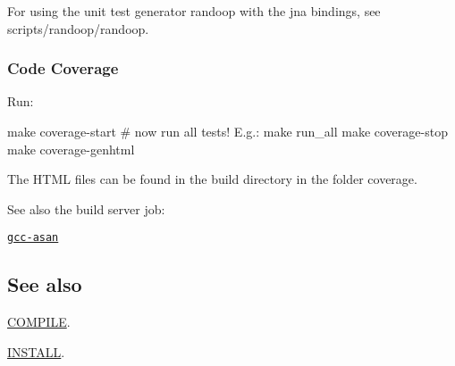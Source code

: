 For using the unit test generator randoop with the jna bindings, see {\ttfamily scripts/randoop/randoop}.

\subsubsection*{Code Coverage}

Run\+: \begin{DoxyVerb}    make coverage-start
    # now run all tests! E.g.:
    make run_all
    make coverage-stop
    make coverage-genhtml
\end{DoxyVerb}


The H\+T\+ML files can be found in the build directory in the folder {\ttfamily coverage}.

See also the build server job\+:


\begin{DoxyItemize}
\item \href{https://build.libelektra.org/job/elektra-incremental/}{\tt gcc-\/asan}
\end{DoxyItemize}

\subsection*{See also}


\begin{DoxyItemize}
\item \hyperlink{doc_COMPILE_md}{C\+O\+M\+P\+I\+LE}.
\item \hyperlink{doc_INSTALL_md}{I\+N\+S\+T\+A\+LL}. 
\end{DoxyItemize}